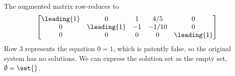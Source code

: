 The augmented matrix row-reduces to\\
%
\begin{equation*}
\begin{bmatrix}
\leading{1} &  0 &  1 &  4/5 &  0\\
0 &  \leading{1} &  -1 &  -1/10 &  0\\ 
0 &  0 &  0 &  0 &  \leading{1}
\end{bmatrix}
\end{equation*}
%
Row 3 represents the equation $0=1$, which is patently false, so the original system has no solutions.  We can express the solution set as the empty set, $\emptyset=\set{\relax}$.

